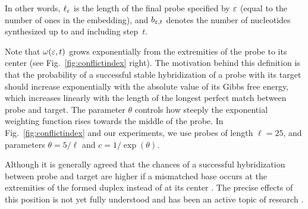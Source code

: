 In other words, $\ell_\varepsilon$ is the length of the final probe specified by $\varepsilon$
(equal to the number of ones in the embedding), and $b_{\varepsilon,t}$ denotes the
number of nucleotides synthesized up to and including step~$t$.

Note that $\omega(\varepsilon,t)$ grows exponentially from the extremities of the probe
to its center (see Fig.~\ref{fig:conflictindex} right). The motivation behind
this definition is that the probability of a successful stable hybridization of
a probe with its target should increase exponentially with the absolute value of
its Gibbs free energy, which increases linearly with the length of the longest
perfect match between probe and target. The parameter $\theta$ controls how
steeply the exponential weighting function rises towards the middle of the
probe. In Fig.~\ref{fig:conflictindex} and our experiments, we use probes of
length $\ell=25$, and parameters $\theta = 5/\ell$ and $c = 1/\exp{(\theta)}$.

Although it is generally agreed that the chances of a successful hybridization
between probe and target are higher if a mismatched base occurs at the
extremities of the formed duplex instead of at its center \citep{Hubbell1999}.
The precise effects of this position is not yet fully understood and has been an
active topic of research \citep{Binder2005}.


